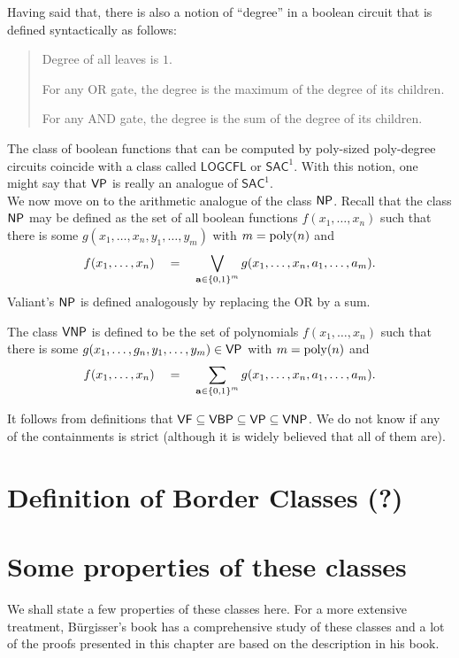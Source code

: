 Having said that, there is also a notion of ``degree'' in a boolean circuit that is defined syntactically as follows:
 \begin{quote}
   Degree of all leaves is $1$. 

   For any OR gate, the degree is the maximum of the degree of its children. 

   For any AND gate, the degree is the sum of the degree of its children. 
 \end{quote}
The class of boolean functions that can be computed by poly-sized poly-degree circuits coincide with a class called $\mathsf{LOGCFL}$ or $\mathsf{SAC}^1$. 
With this notion, one might say that $\mathsf{VP}$ is really an analogue of $\mathsf{SAC}^1$.\\


We now move on to the arithmetic analogue of the class $\NP$. 
Recall that the class $\NP$ may be defined as the set of all boolean functions $f(x_1,\dots, x_n)$ such that there is some $g(x_1,\dots, x_n, y_1,\dots, y_m)$ with $m = \operatorname{poly}(n)$ and 
\[
f(x_1,\dots, x_n)\quad = \quad \bigvee_{\mathbf{a} \in \left\{0,1\right\}^m}  g(x_1,\dots, x_n, a_1,\dots, a_m).
\]
Valiant's $\NP$ is defined analogously by replacing the OR by a sum. 

\begin{definition}[Valiant's $\NP$]\label{defn:vnp}
The class $\mathsf{VNP}$ is defined to be the set of polynomials $f(x_1,\dots, x_n)$ such that there is some $g(x_1,\dots, g_n, y_1,\dots, y_m) \in \mathsf{VP}$ with $m = \operatorname{poly}(n)$ and
\[
f(x_1,\dots, x_n)\quad = \quad \sum_{\mathbf{a} \in \left\{0,1\right\}^m}  g(x_1,\dots, x_n, a_1,\dots, a_m).
\]
\end{definition}

It follows from definitions that $\mathsf{VF} \subseteq \mathsf{VBP} \subseteq \mathsf{VP} \subseteq \mathsf{VNP}$. 
We do not know if any of the containments is strict (although it is widely believed that all of them are). 

\section{Definition of Border Classes (?)}

\section{Some properties of these classes}

We shall state a few properties of these classes here. 
For a more extensive treatment, B\"{u}rgisser's book \cite{bur00} has a comprehensive study of these classes and a lot of the proofs presented in this chapter are based on the description in his book. \\


